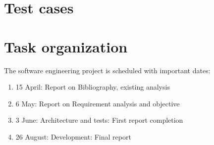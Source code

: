 \documentclass[11pt]{article}
\begin{document}
\section{Test cases}
\par{}
\section{Task organization}
The software engineering project is scheduled with important dates:
\begin{enumerate}
\item 15 April: Report on Bibliography, existing analysis
\item 6 May: Report on Requirement analysis and objective
\item 3 June: Architecture and tests: First report completion
\item 26 August: Development: Final report
\end{enumerate}
\end{document}
